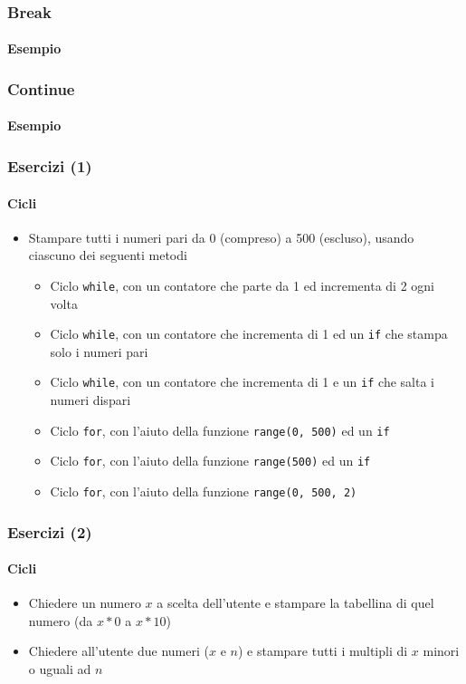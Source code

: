 \begin{exampleframe}
    \frametitle{Break}
    \framesubtitle{Esempio}

\end{exampleframe}

\begin{exampleframe}
    \frametitle{Continue}
    \framesubtitle{Esempio}

\end{exampleframe}

\begin{exerciseframe}
    \frametitle{Esercizi (1)}
    \framesubtitle{Cicli}

    \begin{itemize}
        \item Stampare tutti i numeri pari da 0 (compreso) a 500 (escluso)\pause, usando ciascuno dei seguenti metodi
        \begin{itemize}
            \item Ciclo \texttt{while}, con un contatore che parte da 1 ed incrementa di 2 ogni volta
            \pause
            \item Ciclo \texttt{while}, con un contatore che incrementa di 1 ed un \texttt{if} che stampa solo i numeri pari
            \pause
            \item Ciclo \texttt{while}, con un contatore che incrementa di 1 e un \texttt{if} che salta i numeri dispari
            \pause
            \item Ciclo \texttt{for}, con l'aiuto della funzione \texttt{range(0, 500)} ed un \texttt{if}
            \pause
            \item Ciclo \texttt{for}, con l'aiuto della funzione \texttt{range(500)} ed un \texttt{if}
            \pause
            \item Ciclo \texttt{for}, con l'aiuto della funzione \texttt{range(0, 500, 2)}
        \end{itemize}
    \end{itemize}
\end{exerciseframe}

\begin{exerciseframe}
    \frametitle{Esercizi (2)}
    \framesubtitle{Cicli}

    \begin{itemize}
        \bigskip
        \item Chiedere un numero $x$ a scelta dell'utente e stampare la tabellina di quel numero (da $x*0$ a $x*10$)

        \pause
        \bigskip
        \item Chiedere all'utente due numeri ($x$ e $n$) e stampare tutti i multipli di $x$ minori o uguali ad $n$
    \end{itemize}
\end{exerciseframe}


